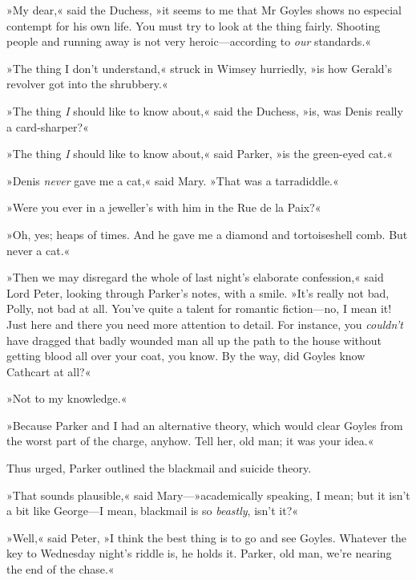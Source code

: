 »My dear,« said the Duchess, »it seems to me that Mr Goyles shows no especial contempt for his own life. You must try to look at the thing fairly. Shooting people and running away is not very heroic\allowbreak---\allowbreak according to \textit{our} standards.«

»The thing I don't understand,« struck in Wimsey hurriedly, »is how Gerald's revolver got into the shrubbery.«

»The thing \textit{I} should like to know about,« said the Duchess, »is, was Denis really a card-sharper?«

»The thing \textit{I} should like to know about,« said Parker, »is the green-eyed cat.«

»Denis \textit{never} gave me a cat,« said Mary. »That was a tarradiddle.«

»Were you ever in a jeweller's with him in the Rue de la Paix?«

»Oh, yes; heaps of times. And he gave me a diamond and tortoiseshell comb. But never a cat.«

»Then we may disregard the whole of last night's elaborate confession,« said Lord Peter, looking through Parker's notes, with a smile. »It's really not bad, Polly, not bad at all. You've quite a talent for romantic fiction\allowbreak---\allowbreak no, I mean it! Just here and there you need more attention to detail. For instance, you \textit{couldn't} have dragged that badly wounded man all up the path to the house without getting blood all over your coat, you know. By the way, did Goyles know Cathcart at all?«

»Not to my knowledge.«

»Because Parker and I had an alternative theory, which would clear Goyles from the worst part of the charge, anyhow. Tell her, old man; it was your idea.«

Thus urged, Parker outlined the blackmail and suicide theory.

»That sounds plausible,« said Mary---»academically speaking, I mean; but it isn't a bit like George\allowbreak---\allowbreak I mean, blackmail is so \textit{beastly}, isn't it?«

»Well,« said Peter, »I think the best thing is to go and see Goyles.  Whatever the key to Wednesday night's riddle is, he holds it. Parker, old man, we're nearing the end of the chase.«
